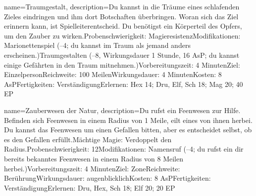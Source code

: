 {
    name={Traumgestalt},
    description={Du kannst in die Träume eines schlafenden Zieles eindringen und ihm dort Botschaften überbringen. Woran sich das Ziel erinnern kann, ist Spielleiterentscheid. Du benötigst ein Körperteil des Opfers, um den Zauber zu wirken.\newline Probenschwierigkeit: Magieresistenz\newline Modifikationen: Marionettenspiel (–4; du kannst im Traum als jemand anders erscheinen.)\newline Traumgestalten (–8, Wirkungsdauer 1 Stunde, 16 AsP; du kannst einige Gefährten in den Traum mitnehmen.)\newline Vorbereitungszeit: 4 Minuten\newline Ziel: Einzelperson\newline Reichweite: 100 Meilen\newline Wirkungsdauer: 4 Minuten\newline Kosten: 8 AsP\newline Fertigkeiten: Verständigung\newline Erlernen: Hex 14; Dru, Elf, Sch 18; Mag 20; 40 EP}
}


{
    name={Zauberwesen der Natur},
    description={Du rufst ein Feenwesen zur Hilfe. Befinden sich Feenwesen in einem Radius von 1 Meile, eilt eines von ihnen herbei. Du kannst das Feenwesen um einen Gefallen bitten, aber es entscheidet selbst, ob es den Gefallen erfüllt.\newline Mächtige Magie: Verdoppelt den Radius.\newline Probenschwierigkeit: 12\newline Modifikationen: Namensruf (–4; du rufst ein dir bereits bekanntes Feenwesen in einem Radius von 8 Meilen herbei.)\newline Vorbereitungszeit: 4 Minuten\newline Ziel: Zone\newline Reichweite: Berührung\newline Wirkungsdauer: augenblicklich\newline Kosten: 8 AsP\newline Fertigkeiten: Verständigung\newline Erlernen: Dru, Hex, Sch 18; Elf 20; 20 EP}
}



